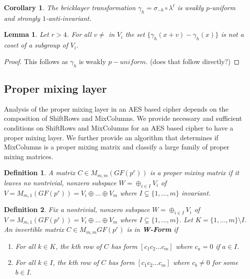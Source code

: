 \documentclass[11pt]{amsart}
\newtheorem{definition}{{\bf Definition}}
\newtheorem{lemma}[theorem]{{\bf Lemma }}
\newtheorem{corollary}[theorem]{{\bf Corollary}}
\begin{document}
\begin{corollary}
The bricklayer transformation $\gamma_h = \sigma_{-b} \circ \lambda^\ell$ is weakly $p$-uniform and strongly $1$-anti-invariant.
\end{corollary}

\begin{lemma}
Let $r>4$. For all $v \neq $ in $V_i$ the set $\{\gamma_h(x + v) - \gamma_h(x)\}$ is not a coset of a subgroup of $V_i$.
\end{lemma}
\begin{proof}
This follows as $\gamma_h$ is weakly $p-uniform$. (does that follow directly?)
\end{proof}





\subsection{Proper mixing layer}
Analysis of the proper mixing layer in an AES based cipher depends on the composition of ShiftRows and MixColumns. We provide necessary and sufficient conditions on ShiftRows and MixColumns for an AES based cipher to have a proper mixing layer.  We further provide an algorithm that determines if MixColumns is a proper mixing matrix and classify a large family of proper mixing matrices.

\begin{definition}
A matrix $C \in M_{m,m}(GF(p^r))$ is a proper mixing matrix if it leaves no nontrivial, nonzero subspace $W = \oplus_{i \in I} V_i$ of $V = M_{m,1}(GF(p^r))=V_i \oplus \dots \oplus V_m$ where $I \subsetneq \{1,\dots,m\}$ invariant.
\end{definition}

\begin{definition}
Fix a nontrivial, nonzero subspace $W = \oplus_{i \in I} V_i$ of $V = M_{m,1}(GF(p^r))=V_i \oplus \dots \oplus V_m$ where $I \subsetneq \{1,\dots,m\}$. Let $K = \{1,\dots,m\} \setminus I$. An invertible matrix $C \in M_{m,m}GF(p^r)$ is in \textbf{W-Form} if
\begin{enumerate}
\item For all $k \in K$, the $k$th row of $C$ has form $[c_1 c_2 \dots c_m]$ where $c_a = 0$ if $a \in I$.
\item For all $k \in I$, the $k$th row of $C$ has form $[c_1 c_2 \dots c_m]$ where $c_b \neq 0$ for some $b \in I$.
\end{enumerate}
\end{definition}
\end{document}
